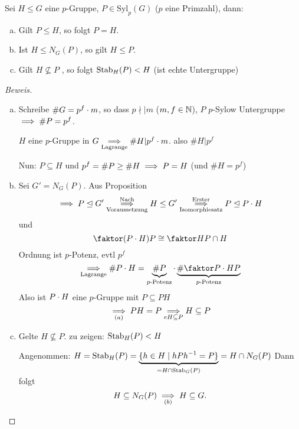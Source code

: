 \documentclass[a4paper]{report}
\begin{document}
\begin{lemm}
  Sei $H \le G$ eine $p$-Gruppe, $P \in \mathrm{Syl}_{p}(G)$ ($p$ eine Primzahl), dann:
  \begin{enumerate}[(a)]
    \item Gilt $P \le H$, so folgt $P = H$.
    \item Ist $H \le N_{G}(P)$, so gilt $H \le P$.
    \item Gilt $H \nsubseteq P$ , so folgt $\operatorname{Stab}_{H}(P) < H$ (ist echte Untergruppe)
  \end{enumerate}
\begin{proof}[Beweis]
  \begin{enumerate}[(a)]
          \item Schreibe $\#G = p^{f}\cdot m$, so dass $p \nmid | m$ ($m, f \in \mathbb{N}$), $P$ $p$-Sylow Untergruppe $\implies \#P = p^{f}$.

          $H$ eine $p$-Gruppe in $G \underset{\text{Lagrange}}{\implies} \#H | p^{f} \cdot m$. also $\#H | p^{f}$

          Nun: $P \subseteq H$ und $p^{f} = \#P \ge \#H \implies P = H$ (und $\#H = p^{f}$)
    \item Sei $G' = N_{G}(P)$. Aus Proposition
          \[\imp P \nt G' \overunderset{\text{Nach}}{\text{Voraussetzung}}\imp H \le G' \overunderset{\text{Erster}}{\text{Isomorphiesatz}} \imp P \nt P \cd H\] und
          \[\fak {(P \cd H)}{P} \cong \fak H{P \cap H}\]
          Ordnung ist $p$-Potenz, evtl $p^{f}$
          \[\underset{\text{Lagrange}}\imp \#P \cd H = \ubr{\#P}_{p\text{-Potenz}} \cd \ubr{\#\fak{P \cd H}{P}}_{p\text{-Potenz}}\]
          Also ist $P \cdot H$ eine $p$-Gruppe mit $P \subseteq PH$
          \[\underset{(a)} {\implies} PH = P \underset{eH \subseteq P}{\implies} H \subseteq P\]
    \item Gelte $H \nsubseteq P$. zu zeigen: $\operatorname{Stab}_{H}(P) < H$

          Angenommen: $H = \operatorname{Stab}_{H}(P) = \underbrace{\{h \in H \mid hPh^{-1} = P\}}_{=H \cap \operatorname{Stab}_{G}(P)} = H \cap N_{G}(P)$
          Dann folgt
          \[H \subseteq N_{G}(P) \underset{(b)} {\implies} H \subseteq G. \qedhere\]
  \end{enumerate}
\end{proof}
\end{lemm}
\end{document}
